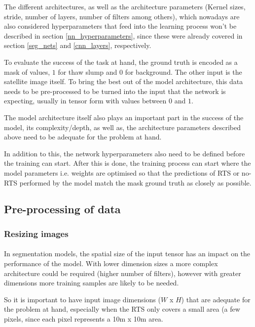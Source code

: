 The different architectures, as well as the architecture parameters (Kernel sizes, stride, number of layers, number of filters among others), which nowadays are also considered hyperparameters that feed into the learning process won't be described in section \ref{nn_hyperparameters}, since these were already covered in section \ref{seg_nets} and \ref{cnn_layers}, respectively.

To evaluate the success of the task at hand, the ground truth is encoded as a mask of values, $1$ for thaw slump and $0$ for background. The other input is the satellite image itself. To bring the best out of the model architecture, this data needs to be pre-processed to be turned into the input that the network is expecting, usually in tensor form with values between $0$ and $1$.

The model architecture itself also plays an important part in the success of the model, its complexity/depth, as well as, the architecture parameters described above need to be adequate for the problem at hand.

In addition to this, the network hyperparameters also need to be defined before the training can start. After this is done, the training process can start where the model parameters \gls{i.e.} weights are optimised so that the predictions of \gls{RTS} or no-\gls{RTS} performed by the model match the mask ground truth as closely as possible.

\subsection{Pre-processing of data} \label{data_preproc}
\subsubsection{Resizing images} \label{img_resize}
\paragraph{}
In segmentation models, the spatial size of the input tensor has an impact on the performance of the model. With lower dimension sizes a more complex architecture could be required (higher number of filters), however with greater dimensions more training samples are likely to be needed.

So it is important to have input image dimensions ($W$ x $H$) that are adequate for the problem at hand, especially when the \gls{RTS} only covers a small area (a few pixels, since each pixel represents a 10m x 10m area.


